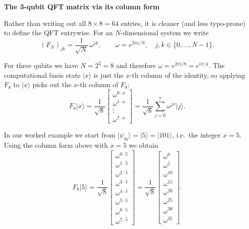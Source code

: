 \documentclass[a4paper,11pt]{article}
\begin{document}
\textbf{The 3-qubit QFT matrix via its column form}

Rather than writing out all $8 \times 8 = 64$ entries, it is cleaner (and
less typo-prone) to define the QFT entrywise. For an $N$-dimensional
system we write
\[
  (F_N)_{jk}
  = \frac{1}{\sqrt{N}}\,\omega^{jk},
  \qquad
  \omega = e^{2\pi i / N},\quad
  j,k \in \{0,\dots,N-1\}.
\]

For three qubits we have $N = 2^3 = 8$ and therefore
\(\omega = e^{2\pi i / 8} = e^{i\pi/4}\).
The computational basis state $\lvert x \rangle$ is just the $x$-th
column of the identity, so applying $F_8$ to $\lvert x \rangle$ picks out
the $x$-th column of $F_8$:
\[
  F_8 \lvert x \rangle
  = \frac{1}{\sqrt{8}}
    \begin{bmatrix}
      \omega^{0 \cdot x} \\
      \omega^{1 \cdot x} \\
      \vdots \\
      \omega^{7 \cdot x}
    \end{bmatrix}
  = \frac{1}{\sqrt{8}}
    \sum_{j=0}^{7} \omega^{jx} \lvert j \rangle.
\]

In our worked example we start from $\lvert \psi_{\text{in}} \rangle
= \lvert 5 \rangle = \lvert 101 \rangle$, i.e.\ the integer $x = 5$.
Using the column form above with $x = 5$ we obtain
\[
  F_8 \lvert 5 \rangle
  = \frac{1}{\sqrt{8}}
    \begin{bmatrix}
      \omega^{0 \cdot 5} \\
      \omega^{1 \cdot 5} \\
      \omega^{2 \cdot 5} \\
      \omega^{3 \cdot 5} \\
      \omega^{4 \cdot 5} \\
      \omega^{5 \cdot 5} \\
      \omega^{6 \cdot 5} \\
      \omega^{7 \cdot 5}
    \end{bmatrix}
  = \frac{1}{\sqrt{8}}
    \begin{bmatrix}
      \omega^{0} \\
      \omega^{5} \\
      \omega^{10} \\
      \omega^{15} \\
      \omega^{20} \\
      \omega^{25} \\
      \omega^{30} \\
      \omega^{35}
    \end{bmatrix}.
\]
\end{document}
